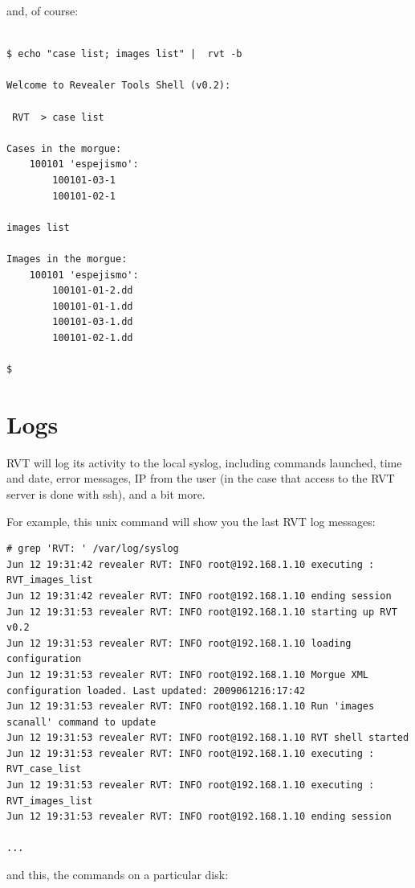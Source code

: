 \documentclass[a4paper,11pt,oneside]{report}
\begin{document}
and, of course:


\begin{verbatim}
 
$ echo "case list; images list" |  rvt -b

Welcome to Revealer Tools Shell (v0.2):

 RVT  > case list

Cases in the morgue: 
	100101 'espejismo':
		100101-03-1
		100101-02-1

images list

Images in the morgue: 
	100101 'espejismo':
		100101-01-2.dd
		100101-01-1.dd
		100101-03-1.dd
		100101-02-1.dd

$
\end{verbatim}





\section{Logs}

RVT will log its activity to the local syslog, including commands launched, time and date, error messages, IP from the user (in the case that access to the RVT server is done with ssh), and a bit more.

For example, this unix command will show you the last RVT log messages:

{ \footnotesize
\begin{verbatim}
# grep 'RVT: ' /var/log/syslog
Jun 12 19:31:42 revealer RVT: INFO root@192.168.1.10 executing : RVT_images_list  
Jun 12 19:31:42 revealer RVT: INFO root@192.168.1.10 ending session 
Jun 12 19:31:53 revealer RVT: INFO root@192.168.1.10 starting up RVT v0.2 
Jun 12 19:31:53 revealer RVT: INFO root@192.168.1.10 loading configuration 
Jun 12 19:31:53 revealer RVT: INFO root@192.168.1.10 Morgue XML configuration loaded. Last updated: 2009061216:17:42 
Jun 12 19:31:53 revealer RVT: INFO root@192.168.1.10 Run 'images scanall' command to update 
Jun 12 19:31:53 revealer RVT: INFO root@192.168.1.10 RVT shell started 
Jun 12 19:31:53 revealer RVT: INFO root@192.168.1.10 executing : RVT_case_list  
Jun 12 19:31:53 revealer RVT: INFO root@192.168.1.10 executing : RVT_images_list  
Jun 12 19:31:53 revealer RVT: INFO root@192.168.1.10 ending session 

...
\end{verbatim}
}

and this, the commands on a particular disk:
\end{document}
